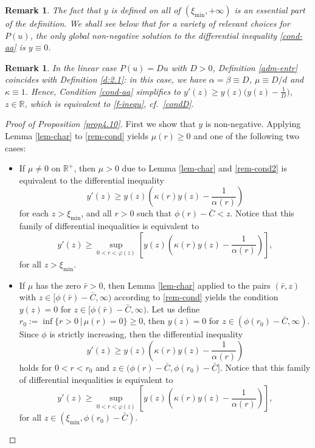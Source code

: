 \documentclass[reqno]{amsart}
\newtheorem{remark}[lemma]{Remark}
\newcommand{\R}{\mathbb{R}}
\begin{document}
%
\begin{remark}
    The fact that $y$ is defined on all of $(\xi_{\min},+\infty)$ is an essential part of the definition. We shall see below that for a variety of relevant choices for $P(u)$, the only global non-negative solution to the differential inequality \eqref{cond-aa} is $y\equiv0$. 
\end{remark}
%
\begin{remark}
    In the linear case $P(u)=Du$ with $D>0$, Definition \ref{adm-entr} coincides with Definition \ref{d:2.1}: in this case, we have $\alpha=\beta\equiv D$, $\mu\equiv D/d$ and $\kappa\equiv1$. Hence, Condition \eqref{cond-aa} simplifies to $y'(z)\ge y(z)\big(y(z)-\frac1D\big)$, $z\in\R$, which is equivalent to \eqref{f-inequ}, cf.\ \eqref{condD}.
\end{remark}
%
\begin{proof}[Proof of Proposition \ref{prop4.10}]
First we show that $y$ is non-negative. Applying Lemma \ref{lem-char} to \eqref{rem-cond} yields $\mu(r)\ge0$ and one of the following two cases:
\begin{itemize}
\item[(a)] If $\mu\ne0$ on $\R^+$, then $\mu>0$ due to Lemma \ref{lem-char} and \eqref{rem-cond2} is equivalent to the differential inequality 
\begin{equation*}%
  y'(z) \ge y(z)\left(\kappa(r)y(z)-\frac1{\alpha(r)}\right)
\end{equation*}
for each $z>\xi_{\min}$, and all $r>0$ such that $\phi(r)-\bar C<z$. Notice that this family of differential inequalities is equivalent to
\begin{equation}\label{cond-a}
 y'(z) \ge \sup_{0<r<\varphi(z)} \left[y(z)\left(\kappa(r)y(z)-\frac1{\alpha(r)}\right)\right],
\end{equation}
for all $z>\xi_{\min}$.

\item[(b)] If $\mu$ has the zero $\bar r>0$, then Lemma \ref{lem-char} 
applied to the pairs $(\bar r,z)$ with $z\in[\phi(\bar r)-\bar C,\infty)$ according to \eqref{rem-cond} 
yields the condition $y(z)=0$ for $z\in [\phi(\bar r)-\bar C,\infty)$. Let us define $r_0:=\inf\{r>0\,|\,\mu(r)=0\}\geq 0$, then $y(z)=0$ for $z\in (\phi(r_0)-\bar C,\infty)$. Since $\phi$ is strictly increasing, then the differential inequality 
\begin{equation*}%
  y'(z) \ge y(z)\left(\kappa(r)y(z)-\frac1{\alpha(r)}\right)
\end{equation*}
holds for $0<r<r_0$ and $z\in(\phi(r)-\bar C,\phi(r_0)-\bar C]$. 
Notice that this family of differential inequalities is equivalent to
\begin{equation}\label{cond-d}
  y'(z) \ge \sup_{0<r<\varphi(z)} \left[y(z)\left(\kappa(r)y(z)-\frac1{\alpha(r)}\right)\right],
\end{equation}
for all $z\in(\xi_{\min},\phi(r_0)-\bar C)$.
\end{itemize}


\end{proof}
\end{document}
